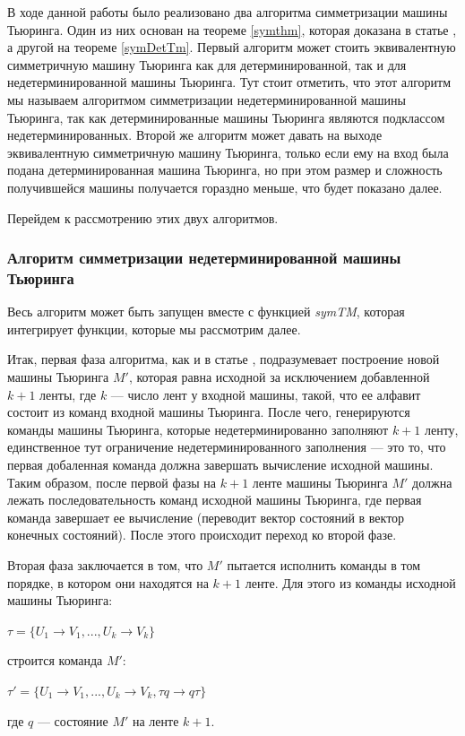 \documentclass[14pt]{matmex-diploma-custom}
\begin{document}
В ходе данной работы было реализовано два алгоритма симметризации машины Тьюринга. Один из них основан на теореме \ref{symthm}, которая доказана в статье \cite{Sapir}, а другой на теореме \ref{symDetTm}. Первый алгоритм может стоить эквивалентную симметричную машину Тьюринга как для детерминированной, так и для недетерминированной машины Тьюринга. Тут стоит отметить, что этот алгоритм мы называем алгоритмом симметризации недетерминированной машины Тьюринга, так как детерминированные машины Тьюринга являются подклассом недетерминированных. Второй же алгоритм может давать на выходе эквивалентную симметричную машину Тьюринга, только если ему на вход была подана детерминированная машина Тьюринга, но при этом размер и сложность получившейся машины получается гораздно меньше, что будет показано далее.

Перейдем к рассмотрению этих двух алгоритмов.

\subsubsection{Алгоритм симметризации недетерминированной машины Тьюринга}
Весь алгоритм может быть запущен вместе с функцией \textit{symTM}, которая интегрирует функции, которые мы рассмотрим далее.

Итак, первая фаза алгоритма, как и в статье \cite{Sapir}, подразумевает построение новой машины Тьюринга $M'$, которая равна исходной за исключением добавленной $k+1$ ленты, где $k$ --- число лент у входной машины, такой, что ее алфавит состоит из команд входной машины Тьюринга. После чего, генерируются команды машины Тьюринга, которые недетерминированно заполняют $k+1$ ленту, единственное тут ограничение недетерминированного заполнения --- это то, что первая добаленная команда должна завершать вычисление исходной машины. Таким образом, после первой фазы на $k+1$ ленте машины Тьюринга $M'$ должна лежать последовательность команд исходной машины Тьюринга, где первая команда завершает ее вычисление (переводит вектор состояний в вектор конечных состояний). После этого происходит переход ко второй фазе. 

Вторая фаза заключается в том, что $M'$ пытается исполнить команды в том порядке, в котором они находятся на $k+1$ ленте. Для этого из команды исходной машины Тьюринга:
\begin{center}
    $\tau = \{ U_1 \to V_1, ... , U_k \to V_k \}$
\end{center}
строится команда $M'$:
\begin{center}
    $\tau' = \{ U_1 \to V_1, ... , U_k \to V_k, \tau q \to q \tau \}$
\end{center}
где $q$ --- состояние $M'$ на ленте $k+1$. 
\end{document}
